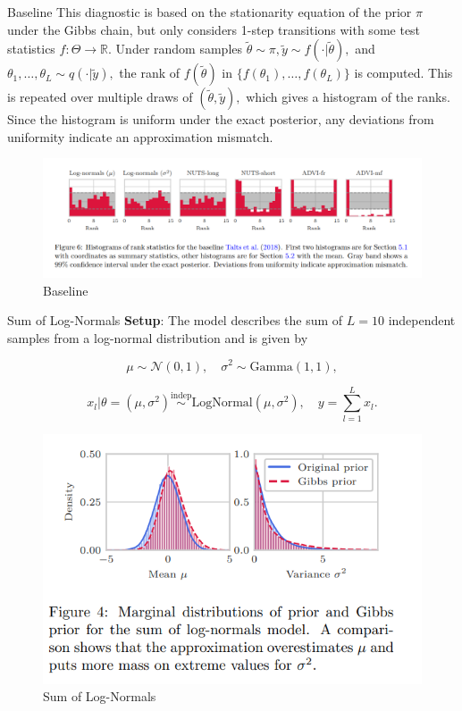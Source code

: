 \documentclass{beamer}
\begin{document}
	
	\begin{frame}{Baseline}
		This diagnostic is based on the stationarity equation of the prior \( \pi \) under the Gibbs chain, but only considers 1-step transitions with some test statistics \( f: \Theta \to \mathbb{R} \). Under random samples \( \tilde{\theta} \sim \pi, \tilde{y} \sim f(\cdot|\tilde{\theta}), \) and \( \theta_1, \ldots, \theta_L \sim q(\cdot|\tilde{y}), \) the rank of \( f(\tilde{\theta}) \) in \( \{f(\theta_1), \ldots, f(\theta_L)\} \) is computed. This is repeated over multiple draws of \( (\tilde{\theta}, \tilde{y}), \) which gives a histogram of the ranks. Since the histogram is uniform under the exact posterior, any deviations from uniformity indicate an approximation mismatch.
		
		
		\begin{figure}[bhtp]
			\includegraphics[width=\linewidth]{baseline-images.png}
			\caption{Baseline}
		\end{figure}
	\end{frame}


	\begin{frame}{Sum of Log-Normals}
		\textbf{Setup}: The model describes the sum of \( L = 10 \) independent samples from a log-normal distribution and is given by
		
		\[
		\mu \sim \mathcal{N}(0, 1), \quad \sigma^2 \sim \text{Gamma}(1, 1),
		\]
		
		\[
		x_l|\theta = (\mu, \sigma^2) \overset{\text{indep}}{\sim} \text{LogNormal}(\mu, \sigma^2), \quad y = \sum_{l=1}^{L} x_l.
		\]
		
		\begin{figure}[bhtp]
			\includegraphics[width=0.8\linewidth]{sum-log-normals.png}
			\caption{Sum of Log-Normals}
		\end{figure}
	\end{frame}
\end{document}
